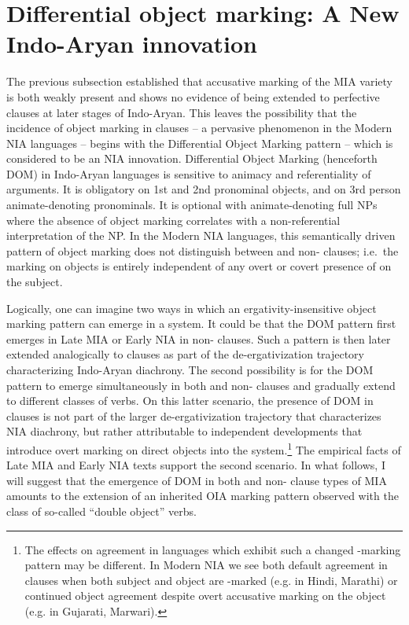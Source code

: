\documentclass[output=paper,
modfonts
]{LSP/langsci}
\begin{document}
\section{Differential object marking: A New Indo-Aryan innovation}  
The previous subsection established that accusative  marking  of the MIA variety is both weakly present and shows no evidence of being extended to perfective  clauses at later stages of Indo-Aryan. This leaves the possibility that the incidence of object marking in  clauses -- a pervasive phenomenon in the Modern NIA languages -- begins with the Differential Object Marking  pattern -- which is considered to be an NIA innovation. Differential Object Marking (henceforth DOM) in Indo-Aryan languages is sensitive to animacy and referentiality  of arguments. It is obligatory on 1st and 2nd pronominal objects, and  on 3rd person animate-denoting pronominals. It is optional with animate-denoting full NPs where the absence of object marking correlates with a non-referential  interpretation of the NP. In the Modern NIA languages, this semantically driven pattern of object marking does not distinguish between  and non- clauses; i.e.\ the  marking on objects is entirely independent of any overt or covert presence of  on the subject.  

Logically, one can imagine two ways in which an ergativity-insensitive object marking pattern can emerge in a system. It could be that the DOM pattern first emerges in 
 Late MIA or Early NIA in non- clauses. Such a pattern is then later extended analogically to  clauses as part of the de-ergativization trajectory characterizing Indo-Aryan diachrony. The second possibility is for the DOM pattern to emerge simultaneously in both  and non- clauses and gradually extend to different classes of verbs. On this latter scenario, the presence of DOM in  clauses is not part of the larger de-ergativization trajectory that characterizes NIA diachrony, but rather attributable to independent developments  that introduce overt marking on direct objects into the  system.\footnote{The effects on agreement in languages which exhibit such  a changed -marking pattern may be different. In Modern NIA we see both default agreement in  clauses  when both subject and object are -marked (e.g. in Hindi, Marathi) or   continued object agreement despite overt accusative marking on the object (e.g. in Gujarati, Marwari).} The empirical facts of Late MIA and Early NIA texts support the second scenario.  In what follows, I will suggest that the  emergence of  DOM in both  and non- clause types of MIA  amounts to  the extension of an inherited OIA  marking pattern observed with the class of so-called ``double object'' verbs.
\end{document}
